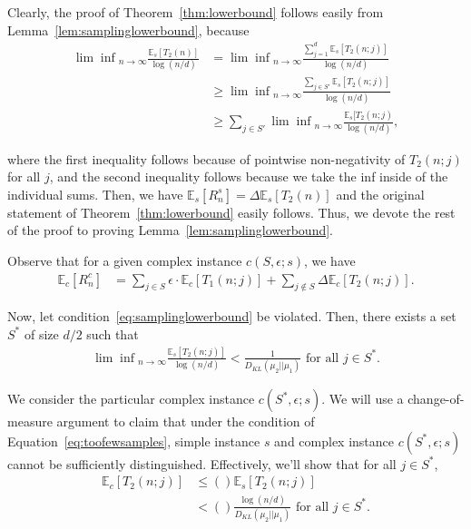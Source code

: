 \begin{Proof}
\begin{lemma}
\end{lemma}

Clearly, the proof of Theorem~\ref{thm:lowerbound} follows easily from Lemma~\ref{lem:samplinglowerbound}, because
\begin{align*}
    {\lim \inf}_{n \to \infty} \frac{\mathbb{E}_s[T_2(n)]}{\log \left(n/d\right)} &= {\lim \inf}_{n \to \infty} \frac{\sum_{j=1}^d \mathbb{E}_s[T_2(n;j)]}{\log \left(n/d\right)} \\
    &\geq {\lim \inf}_{n \to \infty} \frac{\sum_{j \in S'} \mathbb{E}_s[T_2(n;j)]}{\log \left(n/d\right)} \\
    &\geq \sum_{j \in S'} {\lim \inf}_{n \to \infty} \frac{\mathbb{E}_s[T_2(n;j)}{\log \left(n/d\right)} ,
\end{align*}

where the first inequality follows because of pointwise non-negativity of $T_2(n;j)$ for all $j$, and the second inequality follows because we take the inf inside of the individual sums.
Then, we have $\mathbb{E}_s[R_n^s] = \Delta \mathbb{E}_s[T_2(n)]$ and the original statement of Theorem~\ref{thm:lowerbound} easily follows.
Thus, we devote the rest of the proof to proving Lemma~\ref{lem:samplinglowerbound}.

\begin{Proof}
Observe that for a given complex instance $c(S,\epsilon;s)$, we have 
\begin{align*}
    \mathbb{E}_c[R_n^c] &= \sum_{j \in S} \epsilon \cdot \mathbb{E}_c[T_1(n;j)] + \sum_{j \notin S} \Delta \mathbb{E}_c[T_2(n;j)] .
\end{align*}

Now, let condition~\eqref{eq:samplinglowerbound} be violated.
Then, there exists a set $S^*$ of size $d/2$ such that 
\begin{align}\label{eq:toofewsamples}
    {\lim \inf}_{n \to \infty} \frac{\mathbb{E}_s[T_2(n;j)]}{\log \left(n/d\right)} < \frac{1}{D_{KL}(\mu_2 || \mu_1)} \text{ for all } j \in S^* .
\end{align}


We consider the particular complex instance $c(S^*, \epsilon; s)$.
We will use a change-of-measure argument to claim that under the condition of Equation~\eqref{eq:toofewsamples}, simple instance $s$ and complex instance $c(S^*, \epsilon;s)$ cannot be sufficiently distinguished.
Effectively, we'll show that for all $j \in S^*$,
\begin{align*}
    \mathbb{E}_c[T_2(n;j)] &\leq () \mathbb{E}_s[T_2(n;j)] \\
    &< () \frac{\log \left(n/d\right)}{D_{KL}(\mu_2 ||\mu_1)} \text{ for all } j \in S^*. 
\end{align*}


\end{Proof}
\end{Proof}
